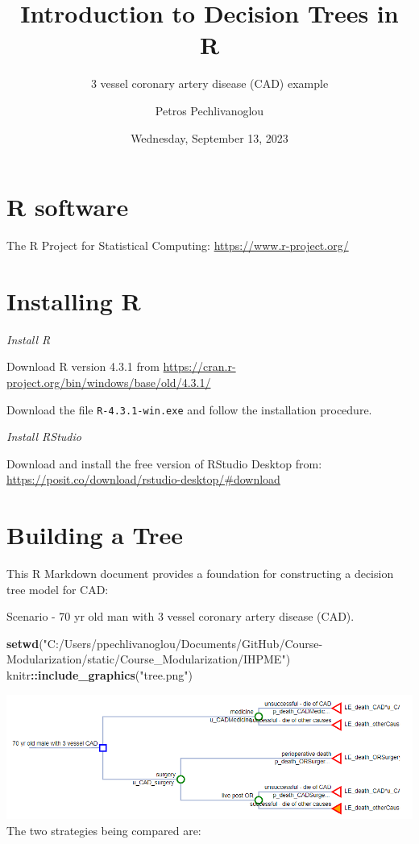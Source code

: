 \documentclass[
]{article}
\title{Introduction to Decision Trees in R}
\subtitle{3 vessel coronary artery disease (CAD) example}
\author{Petros Pechlivanoglou}
\date{Wednesday, September 13, 2023}
\newenvironment{Shaded}{\begin{snugshade}}{\end{snugshade}}
\newcommand{\FunctionTok}[1]{\textcolor[rgb]{0.13,0.29,0.53}{\textbf{#1}}}
\newcommand{\NormalTok}[1]{#1}
\newcommand{\SpecialCharTok}[1]{\textcolor[rgb]{0.81,0.36,0.00}{\textbf{#1}}}
\newcommand{\StringTok}[1]{\textcolor[rgb]{0.31,0.60,0.02}{#1}}
\begin{document}
\maketitle

\hypertarget{r-software}{%
\section{R software}\label{r-software}}

The R Project for Statistical Computing:
\url{https://www.r-project.org/}

\hypertarget{installing-r}{%
\section{Installing R}\label{installing-r}}

\emph{Install R}

Download R version 4.3.1 from
\url{https://cran.r-project.org/bin/windows/base/old/4.3.1/}

Download the file \texttt{R-4.3.1-win.exe} and follow the installation
procedure.

\emph{Install RStudio}

Download and install the free version of RStudio Desktop from:
\url{https://posit.co/download/rstudio-desktop/\#download}

\newpage

\hypertarget{building-a-tree}{%
\section{Building a Tree}\label{building-a-tree}}

This R Markdown document provides a foundation for constructing a
decision tree model for CAD:

Scenario - 70 yr old man with 3 vessel coronary artery disease (CAD).

\begin{Shaded}
\begin{Highlighting}[]
\FunctionTok{setwd}\NormalTok{(}\StringTok{"C:/Users/ppechlivanoglou/Documents/GitHub/Course{-}Modularization/static/Course\_Modularization/IHPME"}\NormalTok{)}
\NormalTok{knitr}\SpecialCharTok{::}\FunctionTok{include\_graphics}\NormalTok{(}\StringTok{"tree.png"}\NormalTok{)}
\end{Highlighting}
\end{Shaded}

\includegraphics[width=13.35in]{tree} The two strategies being compared
are:
\end{document}
